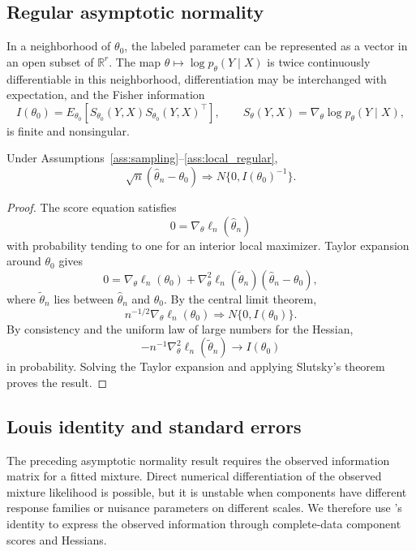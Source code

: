 \subsection{Regular asymptotic normality}

\begin{assumption}
\label{ass:local_regular}
In a neighborhood of \(\theta_0\), the labeled parameter can be represented as a
vector in an open subset of \(\mathbb R^r\).  The map
\(\theta\mapsto \log p_\theta(Y\mid X)\) is twice continuously differentiable
in this neighborhood, differentiation may be interchanged with expectation, and
the Fisher information
\[
    I(\theta_0)
    =
    E_{\theta_0}
    \left[
        S_{\theta_0}(Y,X)S_{\theta_0}(Y,X)^\top
    \right],
    \qquad
    S_{\theta}(Y,X)=\nabla_\theta\log p_\theta(Y\mid X),
\]
is finite and nonsingular.
\end{assumption}

\begin{theorem}
\label{thm:asymptotic_normality}
Under Assumptions~\ref{ass:sampling}--\ref{ass:local_regular},
\[
    \sqrt n(\hat\theta_n-\theta_0)
    \Rightarrow
    N\{0,I(\theta_0)^{-1}\}.
\]
\end{theorem}

\begin{proof}
The score equation satisfies
\[
    0=\nabla_\theta\ell_n(\hat\theta_n)
\]
with probability tending to one for an interior local maximizer.  Taylor
expansion around \(\theta_0\) gives
\[
    0
    =
    \nabla_\theta\ell_n(\theta_0)
    +
    \nabla_\theta^2\ell_n(\tilde\theta_n)
    (\hat\theta_n-\theta_0),
\]
where \(\tilde\theta_n\) lies between \(\hat\theta_n\) and \(\theta_0\).  By the
central limit theorem,
\[
    n^{-1/2}\nabla_\theta\ell_n(\theta_0)
    \Rightarrow
    N\{0,I(\theta_0)\}.
\]
By consistency and the uniform law of large numbers for the Hessian,
\[
    -n^{-1}\nabla_\theta^2\ell_n(\tilde\theta_n)
    \to
    I(\theta_0)
\]
in probability.  Solving the Taylor expansion and applying Slutsky's theorem
proves the result.
\end{proof}

\subsection{Louis identity and standard errors}
\label{sec:louis_theory}

The preceding asymptotic normality result requires the observed information
matrix for a fitted mixture.  Direct numerical differentiation of the observed
mixture likelihood is possible, but it is unstable when components have
different response families or nuisance parameters on different scales.  We
therefore use \citet{louis1982information}'s identity to express the observed information through
complete-data component scores and Hessians.

